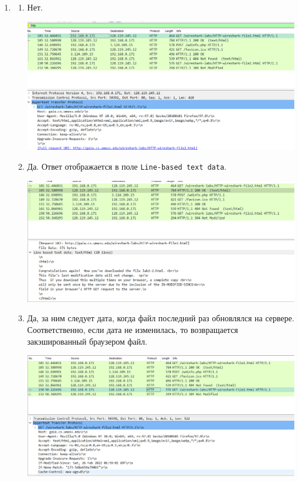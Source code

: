 \documentclass[12pt]{article}
\begin{document}
\begin{enumerate}[leftmargin=0pt, rightmargin=0pt]
\item

\begin{enumerate}[leftmargin=20pt, rightmargin=0pt, itemsep=7pt]

\item

Нет.

\includegraphics[scale=0.5]{2.1.png}

\item

Да. Ответ отображается в поле \texttt{Line-based text data}.

\includegraphics[scale=0.5]{2.2.png}

\item

Да, за ним следует дата, когда файл последний раз обновлялся на сервере. Соответственно, если дата не изменилась, то возвращается закэшированный браузером файл.

\includegraphics[scale=0.5]{2.3.png}


\end{enumerate}
\end{enumerate}
\end{document}
